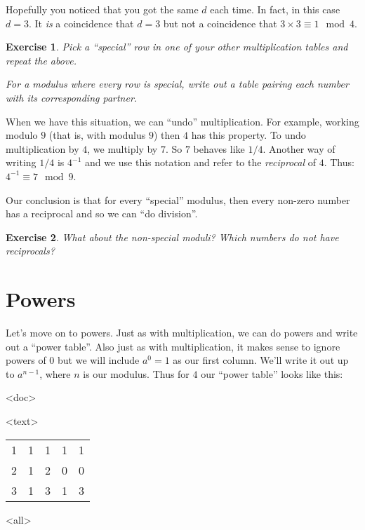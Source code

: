 \documentclass[
  html5,
  mathml,
  use filename
]{internet}
\newtheorem{exercise}{Exercise}
\begin{document}
Hopefully you noticed that you got the same \(d\) each time.
In fact, in this case \(d = 3\).
It \emph{is} a coincidence that \(d = 3\) but not a coincidence that \(3 \times 3 \equiv 1 \mod 4\).

\begin{exercise}
Pick a ``special'' row in one of your other multiplication tables and repeat the above.

For a modulus where every row is special, write out a table pairing each number with its corresponding partner.
\end{exercise}

When we have this situation, we can ``undo'' multiplication.
For example, working modulo \(9\) (that is, with modulus \(9\)) then \(4\) has this property.
To undo multiplication by \(4\), we multiply by \(7\).
So \(7\) behaves like \(1/4\).
Another way of writing \(1/4\) is \(4^{-1}\) and we use this notation and refer to the \emph{reciprocal} of \(4\).
Thus: \(4^{-1} \equiv 7 \mod 9\).

Our conclusion is that for every ``special'' modulus, then every non-zero number has a reciprocal and so we can ``do division''.

\begin{exercise}
What about the non-special moduli?
Which numbers do not have reciprocals?
\end{exercise}

\section{Powers}

Let's move on to powers.
Just as with multiplication, we can do powers and write out a ``power table''.
Also just as with multiplication, it makes sense to ignore powers of \(0\) but we will include \(a^0 = 1\) as our first column.
We'll write it out up to \(a^{n-1}\), where \(n\) is our modulus.
Thus for \(4\) our ``power table'' looks like this:

\begin{center}
\imode<doc>
\imode
<text>
\begin{tabular}{ccccc}
  1 & 1 & 1 & 1 & 1 \\
  2 & 1 & 2 & 0 & 0 \\
  3 & 1 & 3 & 1 & 3 \\
\end{tabular}
\imode
<all>
\end{center}
\end{document}
